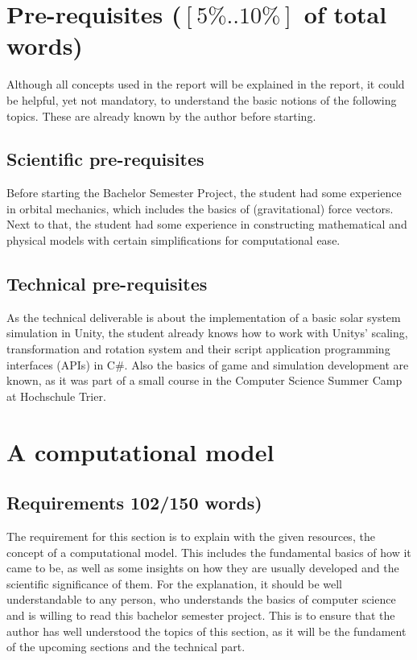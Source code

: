 \documentclass[conference,compsoc]{IEEEtran}
\begin{document}

\section{Pre-requisites ($[5\%..10\%]$ of total words)} 
Although all concepts used in the report will be explained in the report, it could be helpful, yet not mandatory, to understand the basic notions of the following topics. These are already known by the author before starting. 
\subsection{Scientific pre-requisites}
Before starting the Bachelor Semester Project, the student had some experience in orbital mechanics, which includes the basics of (gravitational) force vectors. \\
Next to that, the student had some experience in constructing mathematical and physical models with certain simplifications for computational ease.
\subsection{Technical pre-requisites}
As the technical deliverable is about the implementation of a basic solar system simulation in Unity, the student already knows how to work with Unitys' scaling, transformation and rotation system and their script application programming interfaces (APIs) in C\#. Also the basics of game and simulation development are known, as it was part of a small course in the Computer Science Summer Camp at Hochschule Trier.

\section{A computational model}
\label{sec-computational-model}
\subsection{Requirements 102/150 words)}
The requirement for this section is to explain with the given resources, the concept of a computational model. This includes the fundamental basics of how it came to be, as well as some insights on how they are usually developed and the scientific significance of them. For the explanation, it should be well understandable to any person, who understands the basics of computer science and is willing to read this bachelor semester project. This is to ensure that the author has well understood the topics of this section, as it will be the fundament of the upcoming sections and the technical part.
\end{document}
